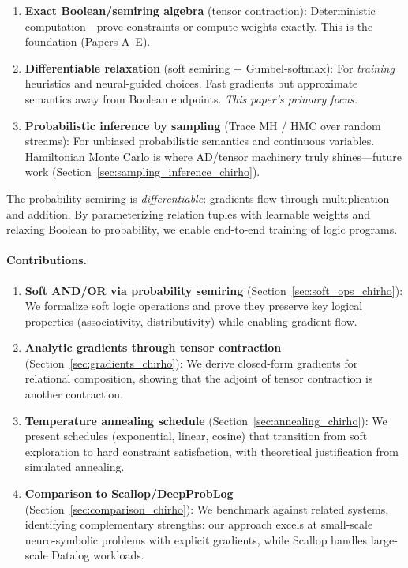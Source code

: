 \documentclass[11pt,a4paper]{article}
\begin{document}
\begin{enumerate}
  \item \textbf{Exact Boolean/semiring algebra} (tensor contraction): Deterministic computation---prove constraints or compute weights exactly. This is the foundation (Papers A--E).

  \item \textbf{Differentiable relaxation} (soft semiring + Gumbel-softmax): For \emph{training} heuristics and neural-guided choices. Fast gradients but approximate semantics away from Boolean endpoints. \emph{This paper's primary focus.}

  \item \textbf{Probabilistic inference by sampling} (Trace MH / HMC over random streams): For unbiased probabilistic semantics and continuous variables. Hamiltonian Monte Carlo is where AD/tensor machinery truly shines---future work (Section~\ref{sec:sampling_inference_chirho}).
\end{enumerate}

The probability semiring is \emph{differentiable}: gradients flow through multiplication and addition.
By parameterizing relation tuples with learnable weights and relaxing Boolean to probability, we enable end-to-end training of logic programs.

\paragraph{Contributions.}
\begin{enumerate}
  \item \textbf{Soft AND/OR via probability semiring} (Section~\ref{sec:soft_ops_chirho}): We formalize soft logic operations and prove they preserve key logical properties (associativity, distributivity) while enabling gradient flow.

  \item \textbf{Analytic gradients through tensor contraction} (Section~\ref{sec:gradients_chirho}): We derive closed-form gradients for relational composition, showing that the adjoint of tensor contraction is another contraction.

  \item \textbf{Temperature annealing schedule} (Section~\ref{sec:annealing_chirho}): We present schedules (exponential, linear, cosine) that transition from soft exploration to hard constraint satisfaction, with theoretical justification from simulated annealing.

  \item \textbf{Comparison to Scallop/DeepProbLog} (Section~\ref{sec:comparison_chirho}): We benchmark against related systems, identifying complementary strengths: our approach excels at small-scale neuro-symbolic problems with explicit gradients, while Scallop handles large-scale Datalog workloads.
\end{enumerate}
\end{document}
